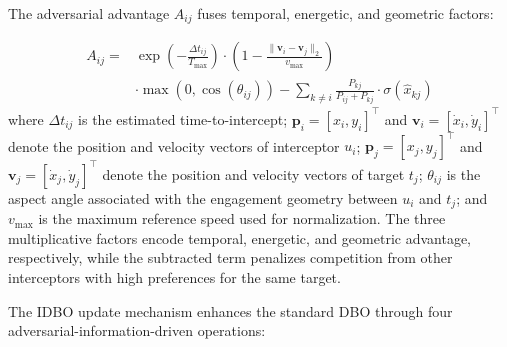 \documentclass[lettersize,journal]{IEEEtran}
\begin{document}
The adversarial advantage $A_{ij}$ fuses temporal, energetic, and geometric factors:

\begin{equation}
\label{eq:adversarial_advantage}
\begin{split}
A_{ij} =& \exp\left(-\frac{\Delta t_{ij}}{T_{\max}}\right) \cdot \left(1 - \frac{\|\mathbf{v}_i - \mathbf{v}_j\|_2}{v_{\max}}\right) \\
&\cdot \max\left(0, \cos(\theta_{ij})\right) - \sum_{k\neq i} \frac{P_{kj}}{P_{ij} + P_{kj}} \cdot \sigma(\hat{x}_{kj})
\end{split}
\end{equation}
where $\Delta t_{ij}$ is the estimated time-to-intercept; $\mathbf{p}_i=[x_i, y_i]^\top$ and $\mathbf{v}_i=[\dot{x}_i, \dot{y}_i]^\top$ denote the position and velocity vectors of interceptor $u_i$; $\mathbf{p}_j=[x_j, y_j]^\top$ and $\mathbf{v}_j=[\dot{x}_j, \dot{y}_j]^\top$ denote the position and velocity vectors of target $t_j$; $\theta_{ij}$ is the aspect angle associated with the engagement geometry between $u_i$ and $t_j$; and $v_{\max}$ is the maximum reference speed used for normalization. The three multiplicative factors encode temporal, energetic, and geometric advantage, respectively, while the subtracted term penalizes competition from other interceptors with high preferences for the same target.

The IDBO update mechanism enhances the standard DBO through four adversarial-information-driven operations:
\end{document}
